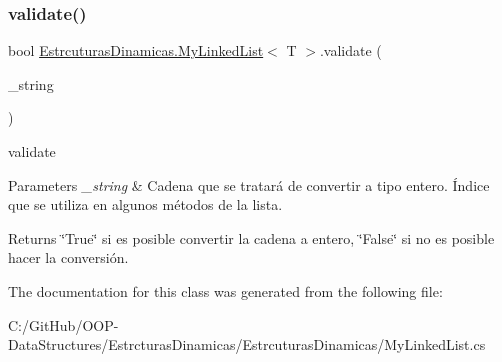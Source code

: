 \subsubsection{\texorpdfstring{validate()}{validate()}}
{\footnotesize\ttfamily bool \mbox{\hyperlink{class_estrcuturas_dinamicas_1_1_my_linked_list}{Estrcuturas\+Dinamicas.\+My\+Linked\+List}}$<$ T $>$.validate (\begin{DoxyParamCaption}\item[{string}]{\+\_\+string }\end{DoxyParamCaption})}



validate 


\begin{DoxyParams}{Parameters}
{\em \+\_\+string} & Cadena que se tratará de convertir a tipo entero. Índice que se utiliza en algunos métodos de la lista.\\
\hline
\end{DoxyParams}
\begin{DoxyReturn}{Returns}
\char`\"{}\+True\char`\"{} si es posible convertir la cadena a entero, \char`\"{}\+False\char`\"{} si no es posible hacer la conversión.
\end{DoxyReturn}


The documentation for this class was generated from the following file\+:\begin{DoxyCompactItemize}
\item 
C\+:/\+Git\+Hub/\+O\+O\+P-\/\+Data\+Structures/\+Estrcturas\+Dinamicas/\+Estrcuturas\+Dinamicas/My\+Linked\+List.\+cs\end{DoxyCompactItemize}
